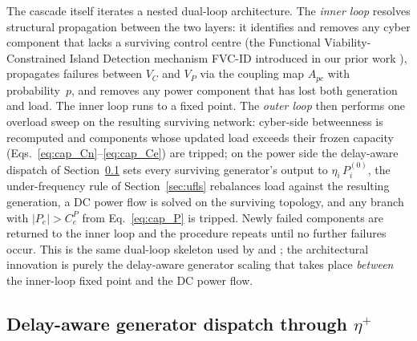 The cascade itself iterates a nested dual-loop architecture.  The
\emph{inner loop} resolves structural propagation between the two
layers: it identifies and removes any cyber component that lacks a
surviving control centre (the Functional Viability-Constrained Island
Detection mechanism FVC-ID introduced in our prior work
\citep{ChenTu2026}), propagates failures between $V_C$ and $V_P$ via
the coupling map $A_{pc}$ with probability~$p$, and removes any power
component that has lost both generation and load.  The inner loop
runs to a fixed point.  The \emph{outer loop} then performs one
overload sweep on the resulting surviving network: cyber-side
betweenness is recomputed and components whose updated load exceeds
their frozen capacity (Eqs.~\eqref{eq:cap_Cn}--\eqref{eq:cap_Ce}) are
tripped; on the power side the delay-aware dispatch of
Section~\ref{sec:delay_dispatch} sets every surviving generator's
output to $\eta_i\,P_i^{(0)}$, the under-frequency rule of
Section~\ref{sec:ufls} rebalances load against the resulting
generation, a DC power flow is solved on the surviving topology, and
any branch with $|P_e|>C_e^{P}$ from Eq.~\eqref{eq:cap_P} is
tripped.  Newly failed components are returned to the inner loop and
the procedure repeats until no further failures occur.  This is the
same dual-loop skeleton used by \citet{Cai2016TSG} and
\citet{Parshani2010}; the architectural innovation is purely the
delay-aware generator scaling that takes place \emph{between} the
inner-loop fixed point and the DC power flow.

\subsection{Delay-aware generator dispatch through
\texorpdfstring{$\eta^{+}$}{eta+}}\label{sec:delay_dispatch}

